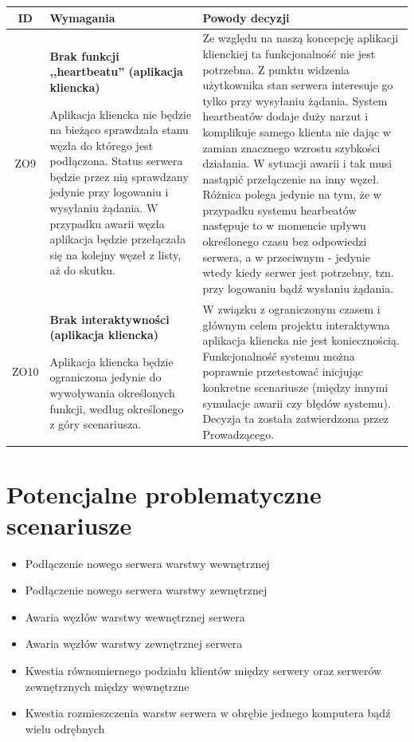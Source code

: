 \pagebreak

\begin{tabularx}{\textwidth}{|c|X|X|}
\hline
\textbf{ID} & \textbf{Wymagania}  & \textbf{Powody decyzji} \\
\hline
\label{z:ZO9} ZO9 &  \textbf{Brak funkcji ,,heartbeatu'' (aplikacja kliencka)}

Aplikacja kliencka nie będzie na bieżąco sprawdzała stanu węzła do którego jest podłączona. Status serwera będzie przez nią sprawdzany jedynie przy logowaniu i wysyłaniu żądania. W przypadku awarii węzła aplikacja będzie przełączała się na kolejny węzeł z listy, aż do skutku. & 
Ze względu na naszą koncepcję aplikacji klienckiej ta funkcjonalność nie jest potrzebna. Z punktu widzenia użytkownika stan serwera interesuje go tylko przy wysyłaniu żądania. System heartbeatów dodaje duży narzut i komplikuje samego klienta nie dając w zamian znacznego wzrostu szybkości działania. W sytuacji awarii i tak musi nastąpić przełączenie na inny węzeł. Różnica polega jedynie na tym, że w przypadku systemu hearbeatów następuje to w momencie upływu określonego czasu bez odpowiedzi serwera, a w przeciwnym - jedynie wtedy kiedy serwer jest potrzebny, tzn. przy logowaniu bądź wysłaniu żądania.\\
\hline

\label{z:ZO10} ZO10 &  \textbf{Brak interaktywności (aplikacja kliencka)}

Aplikacja kliencka będzie ograniczona jedynie do wywoływania określonych funkcji, według określonego z góry scenariusza. & 
W związku z ograniczonym czasem i głównym celem projektu interaktywna aplikacja kliencka nie jest koniecznością. Funkcjonalność systemu można poprawnie przetestować inicjując konkretne scenariusze (między innymi symulacje awarii czy błędów systemu). Decyzja ta została zatwierdzona przez Prowadzącego.\\
\hline

\end{tabularx}


\section[Potencjalne problematyczne scenariusze]{Potencjalne problematyczne scenariusze}

\begin{itemize}
\item Podłączenie nowego serwera warstwy wewnętrznej
\item Podłączenie nowego serwera warstwy zewnętrznej
\item Awaria węzłów warstwy wewnętrznej serwera
\item Awaria węzłów warstwy zewnętrznej serwera
\item Kwestia równomiernego podziału klientów między serwery oraz serwerów zewnętrznych między wewnętrzne
\item Kwestia rozmieszczenia warstw serwera w obrębie jednego komputera bądź wielu odrębnych
\end{itemize}


